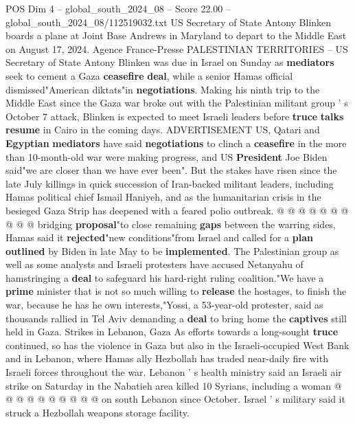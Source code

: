 \begin{textsample}{POS Dim 4 – global\_south\_2024\_08 – Score 22.00 – global\_south\_2024\_08/112519032.txt}  \label{ex:f4_pos_129}
US Secretary of State Antony Blinken boards a plane at Joint Base Andrews in Maryland to depart to the Middle East on August 17, 2024.
Agence France-Presse PALESTINIAN TERRITORIES -- US Secretary of State Antony Blinken was due in Israel on Sunday as \textbf{mediators} seek to cement a Gaza \textbf{ceasefire} \textbf{deal}, while a senior Hamas official dismissed"American diktats"in \textbf{negotiations}.
Making his ninth trip to the Middle East since the Gaza war broke out with the Palestinian militant group ' s October 7 attack, Blinken is expected to meet Israeli leaders before \textbf{truce} \textbf{talks} \textbf{resume} in Cairo in the coming days.
ADVERTISEMENT US, Qatari and \textbf{Egyptian} \textbf{mediators} have said \textbf{negotiations} to clinch a \textbf{ceasefire} in the more than 10-month-old war were making progress, and US \textbf{President} Joe Biden said"we are closer than we have ever been".
But the stakes have risen since the late July killings in quick succession of Iran-backed militant leaders, including Hamas political chief Ismail Haniyeh, and as the humanitarian crisis in the besieged Gaza Strip has deepened with a feared polio outbreak. @ @ @ @ @ @ @ @ @ @ bridging \textbf{proposal}"to close remaining \textbf{gaps} between the warring sides, Hamas said it \textbf{rejected}"new conditions"from Israel and called for a \textbf{plan} \textbf{outlined} by Biden in late May to be \textbf{implemented}.
The Palestinian group as well as some analysts and Israeli protesters have accused Netanyahu of hamstringing a \textbf{deal} to safeguard his hard-right ruling coalition."We have a \textbf{prime} minister that is not so much willing to \textbf{release} the hostages, to finish the war, because he has he own interests,"Yossi, a 53-year-old protester, said as thousands rallied in Tel Aviv demanding a \textbf{deal} to bring home the \textbf{captives} still held in Gaza.
Strikes in Lebanon, Gaza As efforts towards a long-sought \textbf{truce} continued, so has the violence in Gaza but also in the Israeli-occupied West Bank and in Lebanon, where Hamas ally Hezbollah has traded near-daily fire with Israeli forces throughout the war.
Lebanon ' s health ministry said an Israeli air strike on Saturday in the Nabatieh area killed 10 Syrians, including a woman @ @ @ @ @ @ @ @ @ @ on south Lebanon since October.
Israel ' s military said it struck a Hezbollah weapons storage facility.

\end{textsample}

